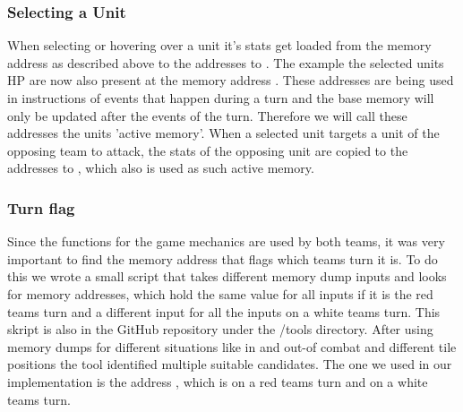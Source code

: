 \subsubsection{Selecting a Unit}
When selecting or hovering over a unit it's stats get loaded from the memory address as described above to the addresses  to . The example the selected units HP are now also present at the memory address . These addresses are being used in instructions of events that happen during a turn and the base memory will only be updated after the events of the turn. Therefore we will call these addresses the units 'active memory'.
When a selected unit targets a unit of the opposing team to attack, the stats of the opposing unit are copied to the addresses  to , which also is used as such active memory.

\subsubsection{Turn flag}
Since the functions for the game mechanics are used by both teams, it was very important to find the memory address that flags which teams turn it is. To do this we wrote a small script that takes different memory dump inputs and looks for memory addresses, which hold the same value for all inputs if it is the red teams turn and a different input for all the inputs on a white teams turn. This skript is also in the GitHub repository under the /tools directory.
After using memory dumps for different situations like in and out-of combat and different tile positions the tool identified multiple suitable candidates. The one we used in our implementation is the address , which is  on a red teams turn and  on a white teams turn.